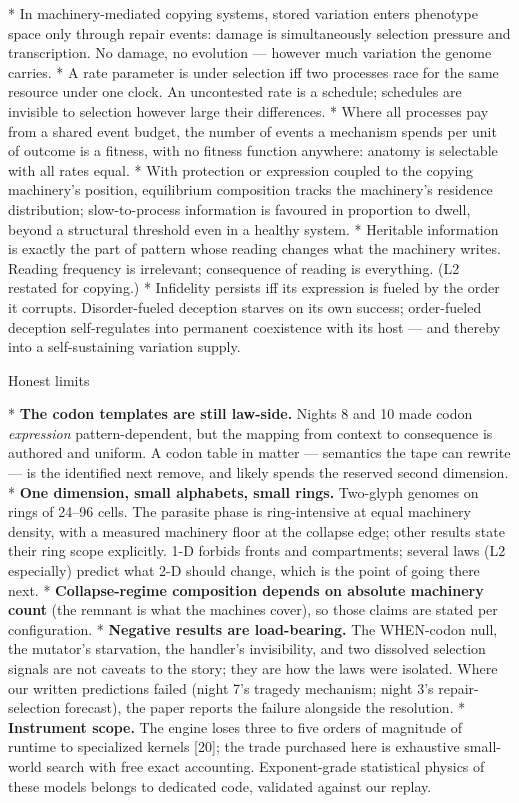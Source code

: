 \begitems
*  In machinery-mediated copying systems,
stored variation enters phenotype space only through repair events:
damage is simultaneously selection pressure and transcription. No
damage, no evolution --- however much variation the genome carries.
*  A rate parameter is under selection iff two
processes race for the same resource under one clock. An
uncontested rate is a schedule; schedules are invisible to
selection however large their differences.
*  Where all processes pay from a
shared event budget, the number of events a mechanism spends per
unit of outcome is a fitness, with no fitness function anywhere:
anatomy is selectable with all rates equal.
*  With protection or expression coupled to
the copying machinery's position, equilibrium composition tracks
the machinery's residence distribution; slow-to-process information
is favoured in proportion to dwell, beyond a structural threshold
even in a healthy system.
*  Heritable information is exactly the part
of pattern whose reading changes what the machinery writes.
Reading frequency is irrelevant; consequence of reading is
everything. (L2 restated for copying.)
*  Infidelity persists iff its expression is
fueled by the order it corrupts. Disorder-fueled deception starves
on its own success; order-fueled deception self-regulates into
permanent coexistence with its host --- and thereby into a
self-sustaining variation supply.
\enditems

\sec Honest limits

\begitems
* {\bf The codon templates are still law-side.} Nights 8 and 10
made codon {\it expression} pattern-dependent, but the mapping from
context to consequence is authored and uniform. A codon table in
matter --- semantics the tape can rewrite --- is the identified next
remove, and likely spends the reserved second dimension.
* {\bf One dimension, small alphabets, small rings.} Two-glyph
genomes on rings of 24--96 cells. The parasite phase is
ring-intensive at equal machinery density, with a measured
machinery floor at the collapse edge; other results state their
ring scope explicitly. 1-D forbids fronts and compartments; several
laws (L2 especially) predict what 2-D should change, which is the
point of going there next.
* {\bf Collapse-regime composition depends on absolute machinery
count} (the remnant is what the machines cover), so those claims
are stated per configuration.
* {\bf Negative results are load-bearing.} The WHEN-codon null, the
mutator's starvation, the handler's invisibility, and two dissolved
selection signals are not caveats to the story; they are how the
laws were isolated. Where our written predictions failed (night 7's
tragedy mechanism; night 3's repair-selection forecast), the paper
reports the failure alongside the resolution.
* {\bf Instrument scope.} The engine loses three to five orders of
magnitude of runtime to specialized kernels [20]; the trade
purchased here is exhaustive small-world search with free exact
accounting. Exponent-grade statistical physics of these models
belongs to dedicated code, validated against our replay.
\enditems

